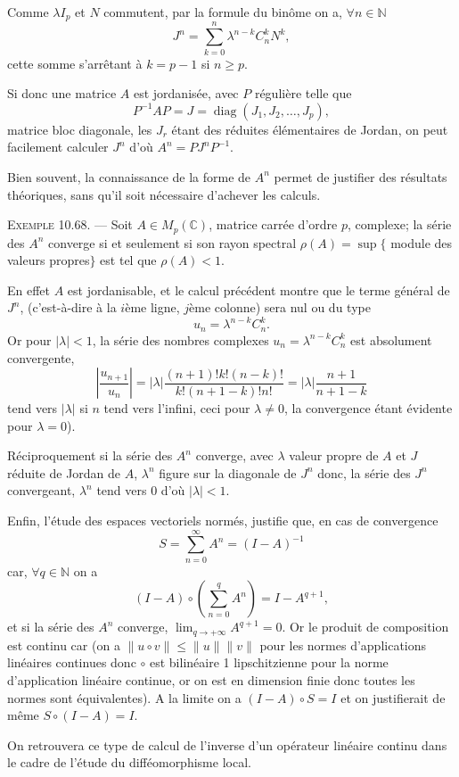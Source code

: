 Comme $\lambda I_p$ et $N$ commutent, par la formule du binôme on a, $\forall n\in\mathbb N$
\[
J^n=\sum_{k=0}^n\lambda^{n-k}C_n^kN^k,
\]
cette somme s'arrêtant à $k=p-1$ si $n\ge p$.

Si donc une matrice $A$ est jordanisée, avec $P$ régulière telle que
\[
P^{-1}AP=J=\operatorname{diag}(J_1,J_2,\ldots,J_p),
\]
matrice bloc diagonale, les $J_r$ étant des réduites élémentaires de Jordan, on peut facilement calculer $J^n$ d'où $A^n=PJ^nP^{-1}$.

Bien souvent, la connaissance de la forme de $A^n$ permet de justifier des résultats théoriques, sans qu'il soit nécessaire d'achever les calculs.

\medskip\noindent\textsc{Exemple 10.68.} --- Soit $A\in M_p(\mathbb C)$, matrice carrée d'ordre $p$, complexe; la série des $A^n$ converge si et seulement si son rayon spectral $\rho(A)=\sup\{$ module des valeurs propres$\}$ est tel que $\rho(A)<1$.

En effet $A$ est jordanisable, et le calcul précédent montre que le terme général de $J^n$, (c'est-à-dire à la $i$ème ligne, $j$ème colonne) sera nul ou du type
\[
u_n=\lambda^{n-k}C_n^k.
\]
Or pour $|\lambda|<1$, la série des nombres complexes $u_n=\lambda^{n-k}C_n^k$ est absolument convergente,
\[
\left|\frac{u_{n+1}}{u_n}\right|
=|\lambda|\frac{(n+1)!k!(n-k)!}{k!(n+1-k)!n!}
=|\lambda|\frac{n+1}{n+1-k}
\]
tend vers $|\lambda|$ si $n$ tend vers l'infini, ceci pour $\lambda\ne0$, la convergence étant évidente pour $\lambda=0$).

Réciproquement si la série des $A^n$ converge, avec $\lambda$ valeur propre de $A$ et $J$ réduite de Jordan de $A$, $\lambda^n$ figure sur la diagonale de $J^n$ donc, la série des $J^n$ convergeant, $\lambda^n$ tend vers 0 d'où $|\lambda|<1$.

Enfin, l'étude des espaces vectoriels normés, justifie que, en cas de convergence
\[
S=\sum_{n=0}^{\infty}A^n=(I-A)^{-1}
\]
car, $\forall q\in\mathbb N$ on a
\[
(I-A)\circ\left(\sum_{n=0}^{q}A^n\right)=I-A^{q+1},
\]
et si la série des $A^n$ converge, $\lim_{q\to+\infty}A^{q+1}=0$. Or le produit de composition est continu car (on a $\lVert u\circ v\rVert\le\lVert u\rVert\lVert v\rVert$ pour les normes d'applications linéaires continues donc $\circ$ est bilinéaire 1 lipschitzienne pour la norme d'application linéaire continue, or on est en dimension finie donc toutes les normes sont équivalentes). A la limite on a $(I-A)\circ S=I$ et on justifierait de même $S\circ(I-A)=I$.

On retrouvera ce type de calcul de l'inverse d'un opérateur linéaire continu dans le cadre de l'étude du difféomorphisme local.

